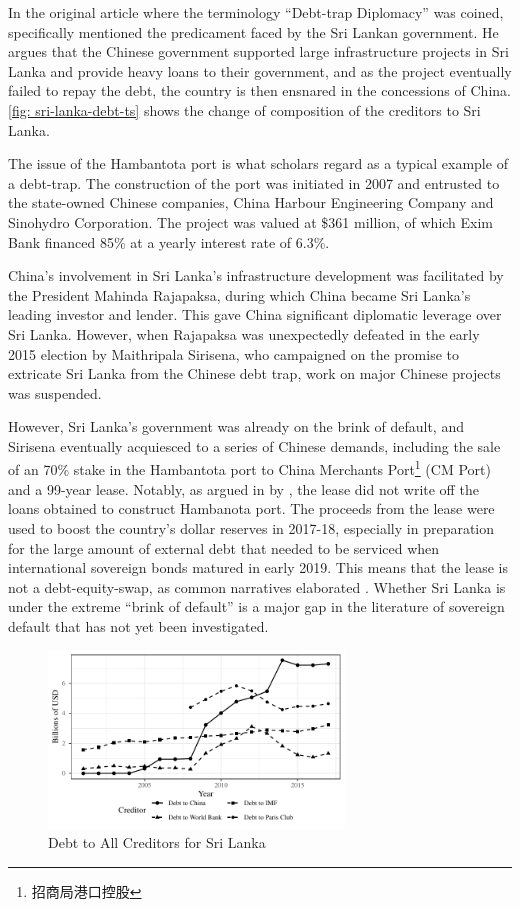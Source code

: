 In the original article where the terminology ``Debt-trap Diplomacy'' was coined, \citeauthor{Chellaney_2017} specifically mentioned the predicament faced by the Sri Lankan government. He argues that the Chinese government supported large infrastructure projects in Sri Lanka and provide heavy loans to their government, and as the project eventually failed to repay the debt, the country is then ensnared in the concessions of China. \autoref{fig: sri-lanka-debt-ts} shows the change of composition of the creditors to Sri Lanka.

The issue of the Hambantota port is what scholars regard as a typical example of a debt-trap\citep*{Moramudali_2020}.
The construction of the port was initiated in 2007 and entrusted to the state-owned Chinese companies, China Harbour Engineering Company and Sinohydro Corporation. The project was valued at \$361 million, of which Exim Bank financed 85\% at a yearly interest rate of 6.3\%.

China's involvement in Sri Lanka's infrastructure development was facilitated by the President Mahinda Rajapaksa, during which China became Sri Lanka's leading investor and lender. This gave China significant diplomatic leverage over Sri Lanka. 
However, when Rajapaksa was unexpectedly defeated in the early 2015 election by Maithripala Sirisena, who campaigned on the promise to extricate Sri Lanka from the Chinese debt trap, work on major Chinese projects was suspended.

However, Sri Lanka's government was already on the brink of default, and Sirisena eventually acquiesced to a series of Chinese demands, including the sale of an 70\% stake in the Hambantota port to China Merchants Port\footnote{招商局港口控股} (CM Port) and a 99-year lease. Notably, as argued in by \citet*{Moramudali_2019}, the lease did not write off the loans obtained to construct Hambanota port. The proceeds from the lease were used to boost the country's dollar reserves in 2017-18, especially in preparation for the large amount of external debt that needed to be serviced when international sovereign bonds matured in early 2019. This means that the lease is not a debt-equity-swap, as common narratives elaborated \citep*{Moramudali_2020}.
Whether Sri Lanka is under the extreme ``brink of default'' is a major gap in the literature of sovereign default that has not yet been investigated.

\begin{figure}[t]
    \centering
    \includegraphics[width = 0.7\textwidth]{fig/sri_lanka_debt_source.pdf}
    \caption{Debt to All Creditors for Sri Lanka}
    \label{fig: sri-lanka-debt-ts}
\end{figure}